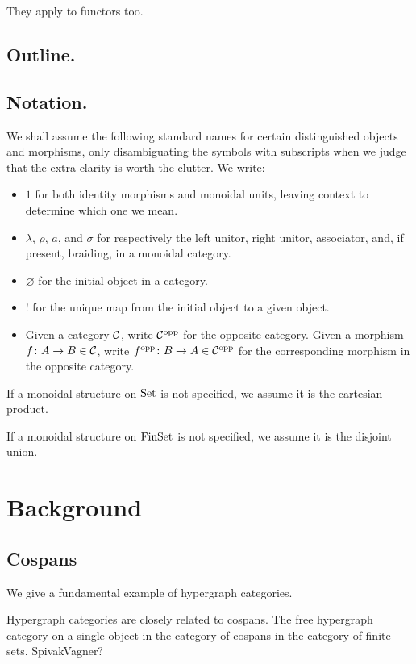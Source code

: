 They apply to functors too.


\subsection{Outline.}
\subsection{Notation.}
We shall assume the following standard names for certain distinguished objects
and morphisms, only disambiguating the symbols with subscripts when we judge
that the extra clarity is worth the clutter. We write: 
\begin{itemize} 
  \item $1$ for both identity morphisms and monoidal units, leaving context to
    determine which one we mean.
  \item $\lambda$, $\rho$, $a$, and $\sigma$ for respectively the left unitor, right unitor,
    associator, and, if present, braiding, in a monoidal category.
  \item $\varnothing$ for the initial object in a category.
  \item $!$ for the unique map from the initial object to a given object.
  \item Given a category $\mathcal C$, write $\mathcal C^{\mathrm{opp}}$ for the opposite category.
    Given a morphism $f{\colon} A \to B \in \mathcal C$, write $f^{\mathrm{opp}}{\colon} B \to A \in
    \mathcal C^{\mathrm{opp}}$ for the corresponding morphism in the opposite category.
\end{itemize}

If a monoidal structure on $\mathrm{Set}$ is not specified, we assume it is the
cartesian product. 

If a monoidal structure on $\mathrm{FinSet}$ is not specified, we assume it is the
disjoint union. 

\section{Background}

\subsection{Cospans}
We give a fundamental example of hypergraph categories.

  Hypergraph categories are closely related to cospans. The free hypergraph
  category on a single object in the category of cospans in the category of
  finite sets. SpivakVagner?
  
